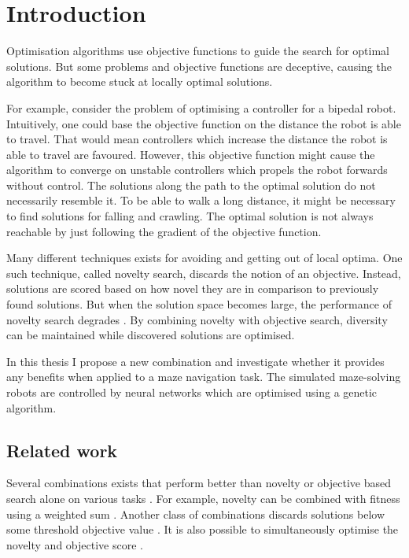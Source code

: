 \section{Introduction}

\label{sec:intro}

Optimisation algorithms use objective functions to guide the search for optimal solutions.
But some problems and objective functions are deceptive, causing the algorithm to become stuck at
locally optimal solutions.

For example, consider the problem of optimising a controller for a bipedal
robot. Intuitively, one could base the objective function on the distance the robot is able to travel.
That would mean controllers which increase the distance the robot is able to travel are favoured.
However, this objective function might cause the algorithm to converge on unstable controllers which
propels the robot forwards without control. The solutions along the path to the optimal solution
do not necessarily resemble it. To be able to walk a long distance, it might be necessary to find
solutions for falling and crawling. The optimal solution is not always reachable by just
following the gradient of the objective function.

Many different techniques exists for avoiding and getting out of local optima. One such technique, called
novelty search, discards the notion of an objective. Instead, solutions are scored based on how novel
they are in comparison to previously found solutions. But when the solution space becomes large, the performance
of novelty search degrades \cite{novelty_not_enough}. By combining novelty with objective search, diversity
can be maintained while discovered solutions are optimised.

In this thesis I propose a new combination and investigate whether it provides any benefits
when applied to a maze navigation task. The simulated maze-solving robots are controlled by
neural networks which are optimised using a genetic algorithm.

\subsection{Related work}
Several combinations exists that perform better than novelty or objective based search alone
on various tasks \cite{ns_study}. For example, novelty can be combined with fitness using a
weighted sum \cite{novelty_not_enough}. Another class of combinations discards solutions below
some threshold objective value \cite{minimal_ns}. It is also possible to simultaneously optimise
the novelty and objective score \cite{multi_ns}.
